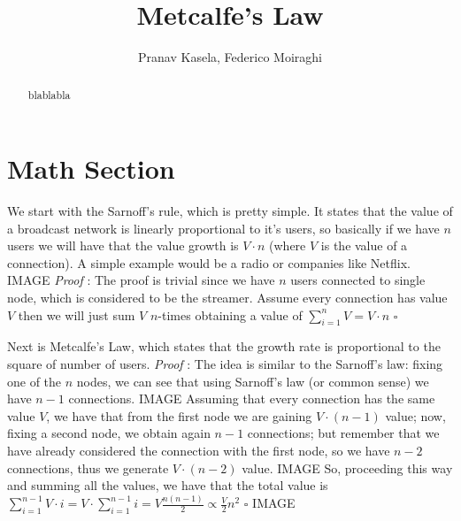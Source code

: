 \documentclass[12pt, a4page]{article}
\title{Metcalfe's Law}
\date{}
\author{Pranav Kasela, Federico Moiraghi}
\begin{document}
\maketitle
\begin{abstract}
blablabla
\end{abstract}
\newpage

\part*{Math Section}
We start with the Sarnoff's rule, which is pretty simple.
It states that the value of a broadcast network is linearly proportional to it's users, so basically if we have $n$ users we will have that the value growth is $V \cdot n$ (where $V$ is the value of a connection).
A simple example would be a radio or companies like Netflix.
\newline IMAGE \newline
\textit{Proof} : The proof is trivial since we have $n$ users connected to single node, which is considered to be the streamer.
Assume every connection has value $V$ then we will just sum $V$ $n$-times obtaining a value of $\sum_{i=1}^{n} V = V \cdot n$ \hfill $\square$
\newline
\newline

Next is Metcalfe's Law, which states that the growth rate is proportional to the square of number of users.\newline
\textit{Proof} : The idea is similar to the Sarnoff's law: fixing one of the $n$ nodes, we can see that using Sarnoff's law (or common sense) we have $n-1$ connections.
IMAGE \newline
Assuming that every connection has the same value $V$, we have that from the first node we are gaining $V \cdot (n - 1)$ value; now, fixing a second node, we obtain again $n-1$ connections; but remember that we have already considered the connection with the first node, so we have $n-2$ connections, thus we generate $V \cdot (n - 2)$ value. \newline
IMAGE \newline
So, proceeding this way and summing all the values, we have that the total value is $\sum_{i=1}^{n-1} V \cdot i = V \cdot \sum_{i=1}^{n-1} i = V \frac{n(n-1)}{2} \propto \frac{V}{2} n^2$  \hfill $\square$
\newline IMAGE \newline
\end{document}
